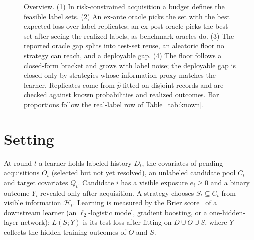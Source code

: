 \documentclass[runningheads]{llncs}
\begin{document}
\begin{figure}[t]
 \centering
 \resizebox{\linewidth}{!}{}
 \caption{Overview. (1) In risk-constrained acquisition a budget defines the feasible label sets. (2) An ex-ante oracle picks the set with the best expected loss over label replicates; an ex-post oracle picks the best set after seeing the realized labels, as benchmark oracles do. (3) The reported oracle gap splits into test-set reuse, an aleatoric floor no strategy can reach, and a deployable gap. (4) The floor follows a closed-form bracket and grows with label noise; the deployable gap is closed only by strategies whose information proxy matches the learner. Replicates come from $\hat p$ fitted on disjoint records and are checked against known probabilities and realized outcomes. Bar proportions follow the real-label row of Table~\ref{tab:known}.}
 \label{fig:framework}
\end{figure}

\section{Setting}
\label{sec:setting}
At round $t$ a learner holds labeled history $D_t$, the covariates of pending acquisitions $O_t$ (selected but not yet resolved), an unlabeled candidate pool $C_t$ and target covariates $Q_t$. Candidate $i$ has a visible exposure $e_i\ge0$ and a binary outcome $Y_i$ revealed only after acquisition. A strategy chooses $S_t\subseteq C_t$ from visible information $\mathcal H_t$. Learning is measured by the Brier score~\cite{brier1950verification} of a downstream learner (an $\ell_2$-logistic model, gradient boosting, or a one-hidden-layer network); $L(S;Y)$ is its test loss after fitting on $D\cup O\cup S$, where $Y$ collects the hidden training outcomes of $O$ and $S$.
\end{document}
